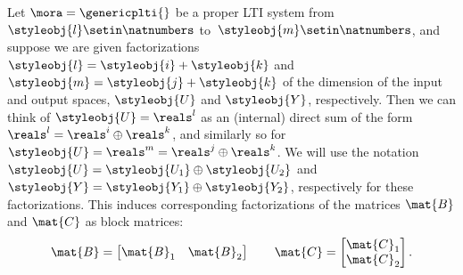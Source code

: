 {%
%

\begin{definition}\label{def:trace-lti-prop}
    Let $\mora = \genericplti{}$ be a proper LTI system from $\styleobj{l}\setin \natnumbers$ to~$\styleobj{m}\setin \natnumbers$, and suppose we are given factorizations $\styleobj{l} = \styleobj{i} + \styleobj{k}$ and $\styleobj{m} = \styleobj{j} + \styleobj{k}$ of the dimension of the input and output spaces, $\styleobj{U}$ and $\styleobj{Y}$, respectively.
    Then we can think of $\styleobj{U} = \reals^l$ as an (internal) direct sum of the form $\reals^l = \reals^i \oplus \reals^k$, and similarly so for $\styleobj{U} = \reals^m = \reals^j \oplus \reals^k$.
    We will use the notation $\styleobj{U} = \styleobj{U_1} \oplus \styleobj{U_2}$ and $\styleobj{Y} = \styleobj{Y_1} \oplus \styleobj{Y_2}$, respectively for these factorizations.
    This induces corresponding factorizations of the matrices $\mat{B}$ and $\mat{C}$ as block matrices:
    \begin{equation}
        \mat{B} =
        \begin{bmatrix}
            \mat{B}_1 & \mat{B}_2
        \end{bmatrix}
        \qquad
        \mat{C} =
        \begin{bmatrix}
            \mat{C}_1 \\
            \mat{C}_2
        \end{bmatrix}.
    \end{equation}


\end{definition}}
